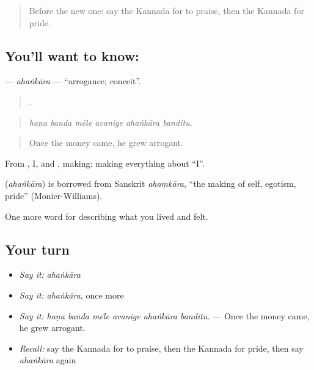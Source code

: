 \label{lesson:KA-C497-ahankara}



\begin{quote}
Before the new one: say the Kannada for to praise, then the Kannada for pride.
\end{quote}

\subsection*{You'll want to know: }
\textbf{} — \emph{ahaṅkāra} — \textquotedblleft{}arrogance; conceit\textquotedblright{}.

\begin{quote}
     .
\end{quote}

\begin{quote}
\emph{haṇa banda mēle avanige ahaṅkāra banditu.}
\end{quote}

\begin{quote}
Once the money came, he grew arrogant.
\end{quote}

From , I, and , making: making everything about \textquotedblleft{}I\textquotedblright{}.

\begin{cousinweb}
\textbf{} (\emph{ahaṅkāra}) is borrowed from Sanskrit \emph{ahaṃkāra}, \textquotedblleft{}the making of self, egotism, pride\textquotedblright{} (Monier-Williams).
\end{cousinweb}

\begin{grammarlens}[title={What you've built}]
One more word for describing what you lived and felt.
\end{grammarlens}

\subsection*{Your turn}
\begin{itemize}
\raggedright
  \item \emph{Say it:} \emph{ahaṅkāra}
  \item \emph{Say it:} \emph{ahaṅkāra}, once more
  \item \emph{Say it:} \emph{haṇa banda mēle avanige ahaṅkāra banditu.} — Once the money came, he grew arrogant.
  \item \emph{Recall:} say the Kannada for to praise, then the Kannada for pride, then say \emph{ahaṅkāra} again
\end{itemize}

